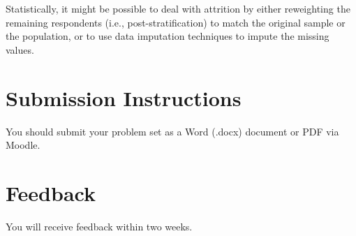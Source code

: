 \documentclass[a4paper]{exam}
\begin{document}
\begin{enumerate}
\begin{enumerate}
\begin{solution}
  Statistically, it might be possible to deal with attrition by either reweighting the remaining respondents (i.e., post-stratification) to match the original sample or the population, or to use data imputation techniques to impute the missing values.
  
  \end{solution}
  
  \end{enumerate}

\end{enumerate}

\section{Submission Instructions}\label{submission-instructions}

You should submit your problem set as a Word (.docx) document or PDF via Moodle.

\section{Feedback}\label{feedback}

You will receive feedback within two weeks.
\end{document}
